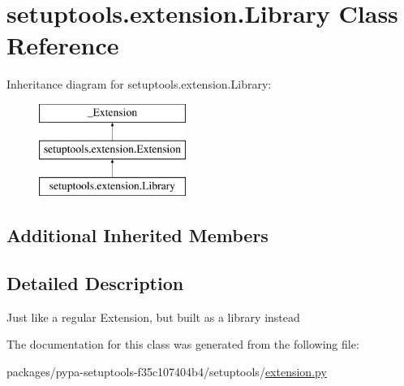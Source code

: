 \hypertarget{classsetuptools_1_1extension_1_1Library}{}\section{setuptools.\+extension.\+Library Class Reference}
\label{classsetuptools_1_1extension_1_1Library}
Inheritance diagram for setuptools.\+extension.\+Library\+:\begin{figure}[H]
\begin{center}
\leavevmode
\includegraphics[height=3.000000cm]{classsetuptools_1_1extension_1_1Library}
\end{center}
\end{figure}
\subsection*{Additional Inherited Members}


\subsection{Detailed Description}
\begin{DoxyVerb}Just like a regular Extension, but built as a library instead\end{DoxyVerb}
 

The documentation for this class was generated from the following file\+:\begin{DoxyCompactItemize}
\item 
packages/pypa-\/setuptools-\/f35c107404b4/setuptools/\hyperlink{pypa-setuptools-f35c107404b4_2setuptools_2extension_8py}{extension.\+py}\end{DoxyCompactItemize}
